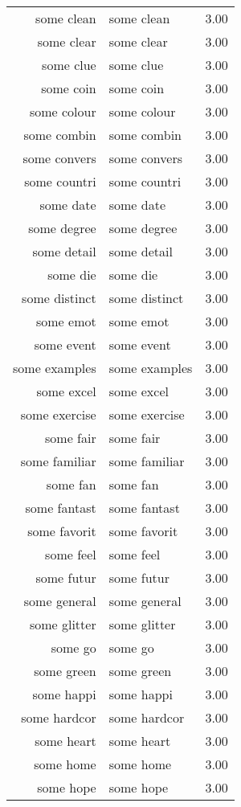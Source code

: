 \begin{table}[ht]
\begin{tabular}{rlr}
  some clean & some clean & 3.00 \\ 
  some clear & some clear & 3.00 \\ 
  some clue & some clue & 3.00 \\ 
  some coin & some coin & 3.00 \\ 
  some colour & some colour & 3.00 \\ 
  some combin & some combin & 3.00 \\ 
  some convers & some convers & 3.00 \\ 
  some countri & some countri & 3.00 \\ 
  some date & some date & 3.00 \\ 
  some degree & some degree & 3.00 \\ 
  some detail & some detail & 3.00 \\ 
  some die & some die & 3.00 \\ 
  some distinct & some distinct & 3.00 \\ 
  some emot & some emot & 3.00 \\ 
  some event & some event & 3.00 \\ 
  some examples & some examples & 3.00 \\ 
  some excel & some excel & 3.00 \\ 
  some exercise & some exercise & 3.00 \\ 
  some fair & some fair & 3.00 \\ 
  some familiar & some familiar & 3.00 \\ 
  some fan & some fan & 3.00 \\ 
  some fantast & some fantast & 3.00 \\ 
  some favorit & some favorit & 3.00 \\ 
  some feel & some feel & 3.00 \\ 
  some futur & some futur & 3.00 \\ 
  some general & some general & 3.00 \\ 
  some glitter & some glitter & 3.00 \\ 
  some go & some go & 3.00 \\ 
  some green & some green & 3.00 \\ 
  some happi & some happi & 3.00 \\ 
  some hardcor & some hardcor & 3.00 \\ 
  some heart & some heart & 3.00 \\ 
  some home & some home & 3.00 \\ 
  some hope & some hope & 3.00 \\ 

\end{tabular}
\end{table}
